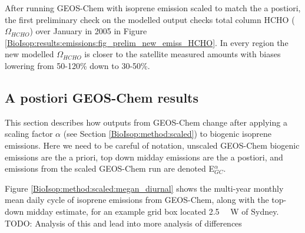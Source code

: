     After running GEOS-Chem with isoprene emission scaled to match the a postiori, the first preliminary check on the modelled output checks total column HCHO ($\Omega_{HCHO}$) over January in 2005 in Figure \ref{BioIsop:results:emissions:fig_prelim_new_emiss_HCHO}.
    In every region the new modelled $\Omega_{HCHO}$ is closer to the satellite measured amounts with biases lowering from 50-120\% down to 30-50\%.
    
    
    
  \subsection{A postiori GEOS-Chem results}
  \label{BioIsop:results:new_emiss}
    
    This section describes how outputs from GEOS-Chem change after applying a scaling factor $\alpha$ (see Section \ref{BioIsop:method:scaled}) to biogenic isoprene emissions.
    Here we need to be careful of notation, unscaled GEOS-Chem biogenic emissions are the a priori, top down midday emissions are the a postiori, and emissions from the scaled GEOS-Chem run are denoted E$^{\alpha}_{GC}$.
    
    Figure \ref{BioIsop:method:scaled:megan_diurnal} shows the multi-year monthly mean daily cycle of isoprene emissions from GEOS-Chem, along with the top-down midday estimate, for an example grid box located 2.5~\degr~ W of Sydney.
    TODO: Analysis of this and lead into more analysis of differences
    
      
